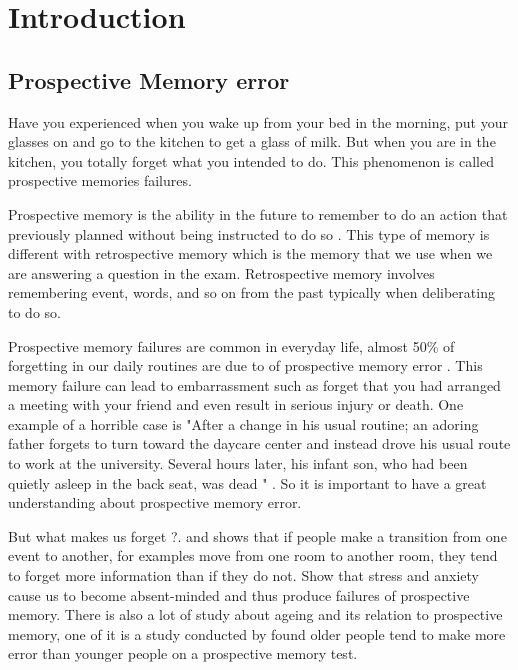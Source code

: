 
\chapter{Introduction}

\section{Prospective Memory error}


Have you experienced when you wake up from your bed in the morning, put your glasses on and
go to the kitchen to get a glass of milk. But when you are in the kitchen, you totally forget what
you intended to do. This phenomenon is called prospective memories failures.

Prospective memory is the ability in the future to remember to do an action that previously planned without being instructed to do so \citep{GROOT2002}. This type of memory is different with retrospective memory which is the memory that we use when we are answering a question in the exam. Retrospective memory involves remembering event, words, and so on from the past typically when deliberating to do so.

Prospective memory failures are common in everyday life, almost 50\% of forgetting in our daily routines are due to of prospective
memory error \citep{Crovitz1984}. This memory failure can lead to embarrassment such as forget that you had arranged a meeting with your friend and even result in
serious injury or death. One example of a horrible case is "After a change in his usual routine; an
adoring father forgets to turn toward the daycare center and instead drove his usual route to work
at the university. Several hours later, his infant son, who had been quietly asleep in the back seat,
was dead " \citep{Einstein2005}. So it is important to have a great understanding about prospective memory error.

But what makes us forget ?. \cite{Radvansky2006} and \cite{Radvansky2010} shows that if people make a transition from one event to another, for examples move
from one room to another room, they tend to forget more information than if they do not.
\cite{Cockburn1994} Show that stress and anxiety cause us to become absent-minded and
thus produce failures of prospective memory. There is also a lot of study about ageing and its relation to prospective memory, one of it is a study conducted by \cite{Scullin2012} found older people tend to make more error than younger people on a prospective memory test.

